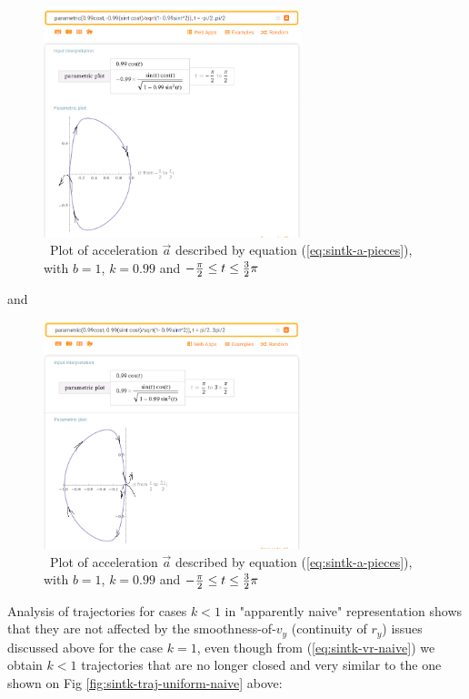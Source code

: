 \documentclass[journal]{IEEEtran}
\begin{document}
\begin{figure}[H]
\includegraphics[width=7.5cm]{sintk-accel-plot-piece1}
\caption{\ Plot of acceleration $\vec{a}$ described by equation (\ref{eq:sintk-a-pieces}), with $b=1$, $k=0.99$ and $ - { \pi \over 2 }  \leq t \leq { 3 \over 2 } \pi $ \bigskip}
\centering
\label{fig:sintk-accel-plot-pieces}
\end{figure}

and

\begin{figure}[H]
\includegraphics[width=7.5cm]{sintk-accel-plot-piece2}
\caption{\ Plot of acceleration $\vec{a}$ described by equation (\ref{eq:sintk-a-pieces}), with $b=1$, $k=0.99$ and $ - { \pi \over 2 }  \leq t \leq { 3 \over 2 } \pi $ \bigskip}
\centering
\label{fig:sintk-accel-plot-pieces}
\end{figure}

Analysis of trajectories for cases $k<1$ in "apparently naive" representation shows that they are not affected by the smoothness-of-$v_y$ (continuity of $r_y$) issues discussed above for the case $k=1$, even though from (\ref{eq:sintk-vr-naive}) we obtain $k<1$ trajectories that are no longer closed and very similar to the one shown on Fig \ref{fig:sintk-traj-uniform-naive} above:
\end{document}
